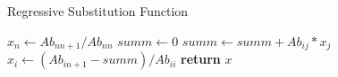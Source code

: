 \documentclass{article}
\begin{document}
  \begin{algorithm}
    \caption{Regressive Substitution Function}
    \begin{algorithmic}[1]
        \State $x_{n} \gets Ab_{nn+1} / Ab_{nn}$
          \State $summ \gets 0$
            \State $summ \gets summ + Ab_{ij} * x_{j}$
          \EndFor
          \State $x_{i} \gets (Ab_{in+1} - summ) / Ab_{ii}$
        \EndFor
        \State \textbf{return} $x$
      \EndProcedure
    \end{algorithmic}
  \end{algorithm}
\end{document}
